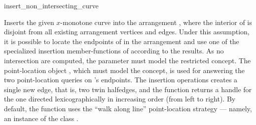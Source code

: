 \ccRefPageBegin

\begin{ccRefFunction}{insert_non_intersecting_curve}

\ccDefinition

Inserts the given $x$-monotone curve  into the arrangement
, where the interior of  is disjoint from all existing
arrangement vertices and edges. Under this assumption, it is possible to
locate the endpoints of  in the arrangement and use one of the
specialized insertion member-functions of  according to the
results. As no intersection are computed, the  parameter
must model the restricted  concept.
The point-location object , which must model the
 concept, is used for answering
the two point-location queries on 's endpoints. The insertion
operations creates a single new edge, that is, two twin halfedges,
and the function returns a handle for the one directed
lexicographically in increasing order (from left to right).
By default, the function uses the ``walk along line'' point-location
strategy --- namely, an instance of the class
.



%

\end{ccRefFunction}

\ccRefPageEnd
